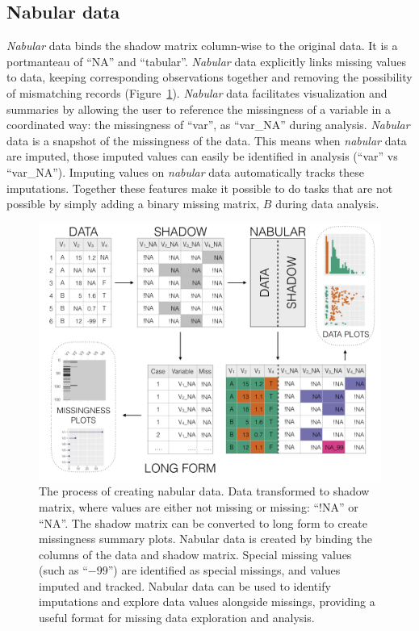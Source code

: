 \documentclass[article]{jss}
\begin{document}
\hypertarget{nabular-data}{%
\subsection{Nabular data}\label{nabular-data}}

\emph{Nabular} data binds the shadow matrix column-wise to the original
data.  It is a portmanteau of ``NA'' and ``tabular''.  \emph{Nabular} data
explicitly links missing values to data, keeping corresponding observations
together and removing the possibility of mismatching records
(Figure~\ref{fig:nabularfig}).  \emph{Nabular} data facilitates
visualization and summaries by allowing the user to reference the
missingness of a variable in a coordinated way: the missingness of ``var'',
as ``var\_NA'' during analysis.  \emph{Nabular} data is a snapshot of the
missingness of the data.  This means when \emph{nabular} data are imputed,
those imputed values can easily be identified in analysis (``var'' vs
``var\_NA'').  Imputing values on \emph{nabular} data automatically tracks
these imputations.  Together these features make it possible to do tasks
that are not possible by simply adding a binary missing matrix, \(B\) during
data analysis.

\begin{figure}[t!]
\centering
\includegraphics[width=1\linewidth]{diagram}
\caption[The process of creating nabular data]{The process of creating
nabular data.  Data transformed to shadow matrix, where values are either
not missing or missing: ``!NA'' or ``NA''.  The shadow matrix can be converted
to long form to create missingness summary plots.  Nabular data is created
by binding the columns of the data and shadow matrix.  Special missing
values (such as ``$-99$'') are identified as special missings, and values imputed
and tracked.  Nabular data can be used to identify imputations and explore
data values alongside missings, providing a useful format for missing data
exploration and analysis.}\label{fig:nabularfig}
\end{figure}
\end{document}
